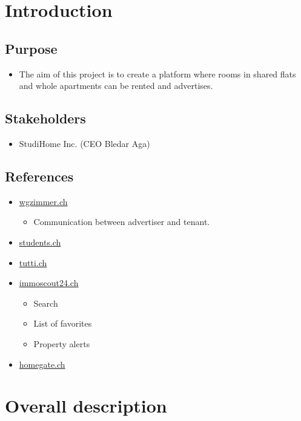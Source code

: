 \documentclass[a4paper,11pt]{article}
\begin{document}
\section{Introduction}

\subsection*{Purpose}
\begin{itemize}
  \item The aim of this project is to create a platform where rooms in shared flats and whole apartments can be rented and advertises.
\end{itemize}

\subsection*{Stakeholders}
\begin{itemize}
  \item StudiHome Inc. (CEO Bledar Aga)
\end{itemize}

\subsection*{References}
\begin{itemize}
  \item \href{www.wgzimmer.ch}{wgzimmer.ch}
  \begin{itemize}
    \item Communication between advertiser and tenant.
  \end{itemize}
  \item \href{http://www.students.ch/wohnen}{students.ch}
  \item \href{http://www.tutti.ch/ganze-schweiz/immobilien/wg-zimmer}{tutti.ch}
  \item \href{http://www.immoscout24.ch/}{immoscout24.ch}
  \begin{itemize}
    \item Search
    \item List of favorites
    \item Property alerts
  \end{itemize}
  \item \href{http://www.homegate.ch/}{homegate.ch}
\end{itemize}

\section{Overall description}
\end{document}
